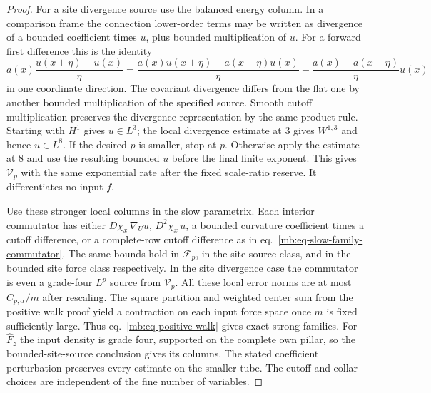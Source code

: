 \documentclass[11pt,letterpaper,reqno]{amsart}
\numberwithin{equation}{section}
\renewcommand{\eqref}[1]{\textup{eq.~\ref{#1}}}
\theoremstyle{definition}
\theoremstyle{remark}
\begin{document}
\begin{proof}
For a site divergence source use the balanced energy column. In a comparison frame the connection lower-order terms may be written as divergence of a bounded coefficient times \(u\), plus bounded multiplication of \(u\). For a forward first difference this is the identity
\[
 a(x)\frac{u(x+\eta)-u(x)}{\eta}
 =\frac{a(x)u(x+\eta)-a(x-\eta)u(x)}{\eta}
     -\frac{a(x)-a(x-\eta)}{\eta}u(x)
\]
in one coordinate direction. The covariant divergence differs from the flat one by another bounded multiplication of the specified source. Smooth cutoff multiplication preserves the divergence representation by the same product rule. Starting with \(H^1\) gives \(u\in L^3\); the local divergence estimate at \(3\) gives \(W^{1,3}\) and hence \(u\in L^8\). If the desired \(p\) is smaller, stop at \(p\). Otherwise apply the estimate at \(8\) and use the resulting bounded \(u\) before the final finite exponent. This gives \(\mathcal V_p\) with the same exponential rate after the fixed scale-ratio reserve. It differentiates no input \(f\).

Use these stronger local columns in the slow parametrix. Each interior commutator has either \(D\chi_x\,\nabla_Uu\), \(D^2\chi_x\,u\), a bounded curvature coefficient times a cutoff difference, or a complete-row cutoff difference as in \eqref{mb:eq-slow-family-commutator}. The same bounds hold in \(\mathcal F_p\), in the site source class, and in the bounded site force class respectively. In the site divergence case the commutator is even a grade-four \(L^p\) source from \(\mathcal V_p\). All these local error norms are at most \(C_{p,\alpha}/m\) after rescaling. The square partition and weighted center sum from the positive walk proof yield a contraction on each input force space once \(m\) is fixed sufficiently large. Thus \eqref{mb:eq-positive-walk} gives exact strong families. For \(\widehat F_z\) the input density is grade four, supported on the complete own pillar, so the bounded-site-source conclusion gives its columns. The stated coefficient perturbation preserves every estimate on the smaller tube. The cutoff and collar choices are independent of the fine number of variables.
\end{proof}
\end{document}
